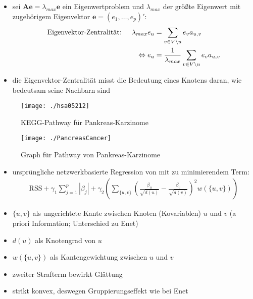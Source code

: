 \documentclass{beamer}
\begin{document}
\begin{frame}
\begin{itemize}
\item sei $\mathbf{A}\mathbf{e}=\lambda_{max} \mathbf{e}$ ein Eigenwertproblem und $\lambda_{max}$ der größte Eigenwert mit zugehörigem Eigenvektor $\mathbf{e}=(e_1,\dots, e_{p})'$:
	\begin{align*}
	&\text{Eigenvektor-Zentralität: } & \lambda_{max} e_u &= \sum_{v \in V\setminus u} e_v a_{u,v} \notag \\
	&&\Leftrightarrow e_u &=\frac{1}{\lambda_{max}} \sum_{v \in V\setminus u} e_v a_{u,v}
	\end{align*}
	\item die Eigenvektor-Zentralität misst die Bedeutung eines Knotens daran, wie bedeutsam seine Nachbarn sind 
\end{itemize}
\end{frame}


\begin{frame}
\begin{figure}
\centering
\texttt{[image: ./hsa05212]}
\caption{KEGG-Pathway für Pankreas-Karzinome}
\label{fig:hsa05212}
\end{figure}
\end{frame}


\begin{frame}
\begin{figure}
\centering
\texttt{[image: ./PancreasCancer]}
\caption{Graph für Pathway von Pankreas-Karzinome}
\label{fig:pancreas}
\end{figure}
\end{frame}



\begin{frame}
	\begin{itemize}
	\item ursprüngliche netzwerkbasierte Regression von \cite{li_network-constrained_2008} mit zu minimierendem Term:
	\begin{align*}
	\text{RSS}
	+\gamma_1\sum_{j=1}^{p}|\beta_j|
	+\gamma_2 \left( \sum_{\{u,v\}} \left(\frac{\beta_u}{\sqrt{d(u)}}-\frac{\beta_v}{\sqrt{d(v)}}\right)^2 w(\{u,v\})\right)
	\end{align*}
	\item $\{u,v\}$ als ungerichtete Kante zwischen Knoten (Kovariablen) $u$ und $v$ (a priori Information; Unterschied zu Enet)
	\item $d(u)$ als Knotengrad von $u$
	\item $w(\{u,v\})$ als Kantengewichtung zwischen $u$ und $v$
	\item zweiter Strafterm bewirkt Glättung
	\item strikt konvex, deswegen Gruppierungseffekt wie bei Enet
	\end{itemize}
\end{frame}
\end{document}
